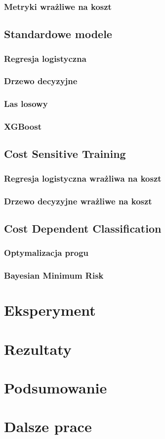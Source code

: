 \documentclass{book}
\begin{document}
\subsection{Metryki wrażliwe na koszt}

\section{Standardowe modele}

\subsection{Regresja logistyczna}

\subsection{Drzewo decyzyjne}

\subsection{Las losowy}

\subsection{XGBoost}

\section{Cost Sensitive Training}

\subsection{Regresja logistyczna wrażliwa na koszt}

\subsection{Drzewo decyzyjne wrażliwe na koszt}

\section{Cost Dependent Classification}

\subsection{Optymalizacja progu}

\subsection{Bayesian Minimum Risk}

\chapter{Eksperyment}

\chapter{Rezultaty}

\chapter{Podsumowanie}

\chapter{Dalsze prace}
\end{document}
